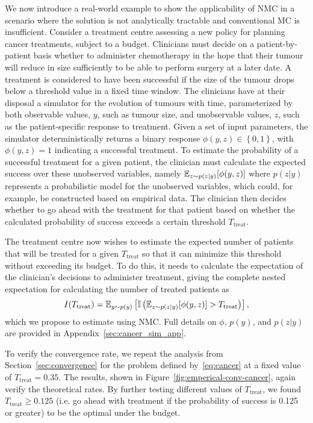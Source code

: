 We now introduce a real-world example to show the applicability of NMC in a scenario
where the solution is not analytically tractable and conventional MC is insufficient.
Consider a treatment centre assessing a new policy for planning cancer treatments, subject to a budget. 
Clinicians must decide on a patient-by-patient basis whether to administer chemotherapy in the
hope that their tumour will reduce in size sufficiently to be able to perform surgery at a later date.
A treatment is considered to have been successful if the size of the tumour drops below a threshold value in a fixed time window.
The clinicians have at their disposal a simulator for the evolution of tumours with time,
parameterized by both observable values, $y$, such as tumour size, and unobservable values, $z$, such as the patient-specific response to treatment.
Given a set of input parameters, the simulator deterministically returns a binary response $\phi(y,z)\in\left\lbrace 0,1\right\rbrace $, with $\phi(y,z) = 1$ indicating a successful treatment.
To estimate the probability of a successful treatment for a given patient, the clinician must calculate the expected
success over these unobserved variables, namely $\mathbb{E}_{z\sim p(z|y)} [\phi(y,z)]$ where $p(z|y)$ represents a probabilistic
model for the unobserved variables, which could, for example, be constructed based on empirical data.
The clinician then decides whether to go ahead with the treatment for that
patient based on whether the calculated probability of success exceeds a certain threshold $T_{\mathrm{treat}}$.

The treatment centre now wishes to estimate the expected number of patients that will be treated for a given $T_{\mathrm{treat}}$ so that it can minimize this threshold without exceeding its budget.
To do this, it needs to calculate the expectation of the clinician's decisions to administer 
treatment, giving the complete nested expectation for calculating the number of treated patients as
\begin{equation}
	\label{eq:cancer}
I(T_{\mathrm{treat}}) = \mathbb{E}_{y \sim p(y)} \left[\mathbb{I}\left(\mathbb{E}_{z\sim p(z|y)} [\phi(y,z)]>T_{\mathrm{treat}}\right)\right],
\end{equation}
which we propose to estimate using NMC.  Full details on $\phi$, $p(y)$, and $p(z|y)$ are 
provided in Appendix~\ref{sec:cancer_sim_app}.

To verify the convergence rate, we repeat the analysis from Section~\ref{sec:convergence} for the problem defined by~\eqref{eq:cancer} at a fixed value of $T_{\mathrm{treat}}=0.35$. 
The results, shown in Figure~\ref{fig:emperical-conv-cancer}, again verify the theoretical rates. 
By further testing different values of $T_{\mathrm{treat}}$, we found $T_{\mathrm{treat}} \ge 0.125$ (i.e.
go ahead with treatment if the probability of success is 0.125 or greater) to be the optimal under the budget.

